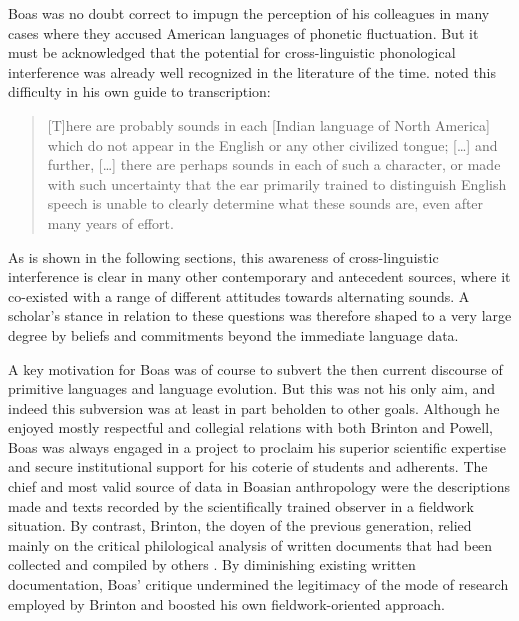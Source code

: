 \documentclass[output=paper]{langscibook}
\begin{document}
Boas was no doubt correct to impugn the perception of his colleagues in many cases where they accused American languages of phonetic fluctuation. But it must be acknowledged that the potential for cross-linguistic phonological interference was already well recognized in the literature of the time. \citet[2]{Powell18801877} noted this difficulty in his own guide to transcription:

\begin{quotation}
[T]here are probably sounds in each [Indian language of North America] which do not appear in the English or any other civilized tongue; […] and further, […] there are perhaps sounds in each of such a character, or made with such uncertainty that the ear primarily trained to distinguish English speech is unable to clearly determine what these sounds are, even after many years of effort. \citep[2]{Powell18801877}
\end{quotation}

As is shown in the following sections, this awareness of cross-linguistic interference is clear in many other contemporary and antecedent sources, where it co-existed with a range of different attitudes towards alternating sounds. A scholar's stance in relation to these questions was therefore shaped to a very large degree by beliefs and commitments beyond the immediate language data.

A key motivation for Boas was of course to subvert the then current discourse of primitive languages and language evolution. But this was not his only aim, and indeed this subversion was at least in part beholden to other goals. Although he enjoyed mostly respectful and collegial relations with both Brinton and Powell, Boas was always engaged in a project to proclaim his superior scientific expertise and secure institutional support for his coterie of students and adherents. The chief and most valid source of data in Boasian anthropology were the descriptions made and texts recorded by the scientifically trained observer in a fieldwork situation. By contrast, Brinton, the doyen of the previous generation, relied mainly on the critical philological analysis of written documents that had been collected and compiled by others \citep[see][21--24]{Darnell1988}. By diminishing existing written documentation, Boas' critique undermined the legitimacy of the mode of research employed by Brinton and boosted his own fieldwork-oriented approach.
\end{document}
